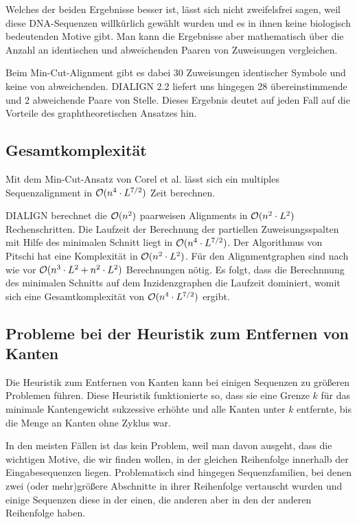 Welches der beiden Ergebnisse besser ist, lässt sich nicht zweifelsfrei sagen, weil diese DNA-Sequenzen willkürlich gewählt wurden und es in ihnen keine biologisch bedeutenden Motive gibt. Man kann die Ergebnisse aber mathematisch über die Anzahl an identischen und abweichenden Paaren von Zuweisungen vergleichen.

Beim Min-Cut-Alignment gibt es dabei 30 Zuweisungen identischer Symbole und keine von abweichenden. DIALIGN 2.2 liefert uns hingegen 28 übereinstimmende und 2 abweichende Paare von Stelle. Dieses Ergebnis deutet auf jeden Fall auf die Vorteile des graphtheoretischen Ansatzes hin. 
 
\subsection{Gesamtkomplexität}

\begin{korollar}
	Mit dem Min-Cut-Ansatz von Corel et al. lässt sich ein multiples Sequenzalignment in $\mathcal{O}(n^4\cdot L^{7/2})$ Zeit berechnen.
\end{korollar}

\begin{beweis}
	DIALIGN berechnet die $\mathcal{O}(n^2)$ paarweisen Alignments in $\mathcal{O}(n^2\cdot L^2)$ Rechenschritten. Die Laufzeit der Berechnung der partiellen Zuweisungsspalten mit Hilfe des minimalen Schnitt liegt in $\mathcal{O}(n^4\cdot L^{7/2})$. Der Algorithmus von Pitschi hat eine Komplexität in $\mathcal{O}(n^2\cdot L^2)$. Für den Alignmentgraphen sind nach wie vor $\mathcal{O}(n^3\cdot L^2 + n^2\cdot L^2)$ Berechnungen nötig. Es folgt, dass die Berechnnung des minimalen Schnitts auf dem Inzidenzgraphen die Laufzeit dominiert, womit sich eine Gesamtkomplexität von $\mathcal{O}(n^4\cdot L^{7/2})$ ergibt.
\end{beweis}

\subsection{Probleme bei der Heuristik zum Entfernen von Kanten}

Die Heuristik zum Entfernen von Kanten kann bei einigen Sequenzen zu größeren Problemen führen. Diese Heuristik funktionierte so, dass sie eine Grenze $k$ für das minimale Kantengewicht sukzessive erhöhte und alle Kanten unter $k$ entfernte, bis die Menge an Kanten ohne Zyklus war. 

In den meisten Fällen ist das kein Problem, weil man davon ausgeht, dass die wichtigen Motive, die wir finden wollen, in der gleichen Reihenfolge innerhalb der Eingabesequenzen liegen. Problematisch sind hingegen Sequenzfamilien, bei denen zwei (oder mehr)größere Abschnitte in ihrer Reihenfolge vertauscht wurden und einige Sequenzen diese in der einen, die anderen aber in den der anderen Reihenfolge haben. 

